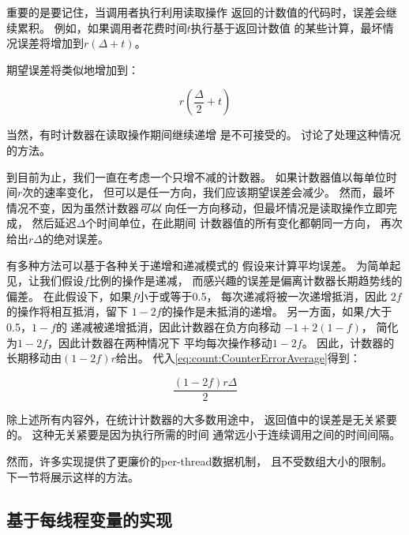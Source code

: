 {	重要的是要记住，当调用者执行利用读取操作
	返回的计数值的代码时，误差会继续累积。
	例如，如果调用者花费时间$t$执行基于返回计数值
	的某些计算，最坏情况误差将增加到$r \left(\Delta + t\right)$。

	期望误差将类似地增加到：

	\begin{equation}
		r \left( \frac{\Delta}{2} + t \right)
	\end{equation}

	当然，有时计数器在读取操作期间继续递增
	是不可接受的。
	讨论了处理这种情况的方法。

	到目前为止，我们一直在考虑一个只增不减的计数器。
	如果计数器值以每单位时间$r$次的速率变化，
	但可以是任一方向，我们应该期望误差会减少。
	然而，最坏情况不变，因为虽然计数器\emph{可以}
	向任一方向移动，但最坏情况是读取操作立即完成，
	然后延迟$\Delta$个时间单位，在此期间
	计数器值的所有变化都朝同一方向，
	再次给出$r \Delta$的绝对误差。

	有多种方法可以基于各种关于递增和递减模式的
	假设来计算平均误差。
	为简单起见，让我们假设$f$比例的操作是递减，
	而感兴趣的误差是偏离计数器长期趋势线的偏差。
	在此假设下，如果$f$小于或等于0.5，
	每次递减将被一次递增抵消，因此
	$2f$的操作将相互抵消，留下
	$1-2f$的操作是未抵消的递增。
	另一方面，如果$f$大于0.5，$1-f$的
	递减被递增抵消，因此计数器在负方向移动
	$-1+2\left(1-f\right)$，
	简化为$1-2f$，因此计数器在两种情况下
	平均每次操作移动$1-2f$。
	因此，计数器的长期移动由$\left( 1-2f \right) r$给出。
	代入\cref{eq:count:CounterErrorAverage}得到：

	\begin{equation}
		\frac{\left( 1 - 2 f \right) r \Delta}{2}
	\end{equation}

	除上述所有内容外，在统计计数器的大多数用途中，
	返回值中的误差是无关紧要的。
	这种无关紧要是因为执行所需的时间
	通常远小于连续调用之间的时间间隔。
}\QuickQuizEnd

\QuickQuizLabel{\StatisticalCounterAccuracy}

然而，许多实现提供了更廉价的per-thread数据机制，
且不受数组大小的限制。
下一节将展示这样的方法。

\subsection{基于每线程变量的实现}
\label{sec:count:Per-Thread-Variable-Based Implementation}

